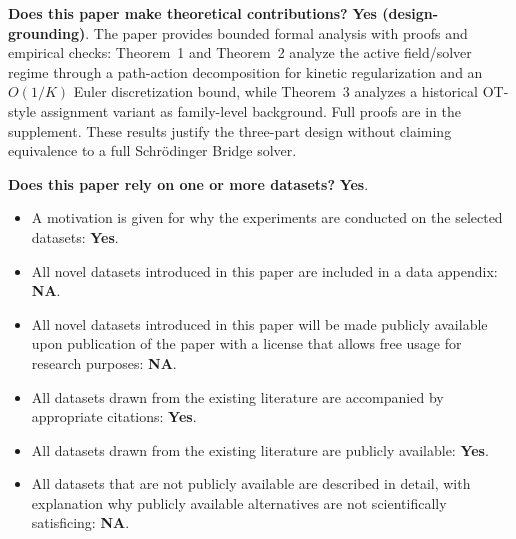 \documentclass[letterpaper]{article}
\begin{document}
\noindent\textbf{Does this paper make theoretical contributions?} \textbf{Yes (design-grounding)}. The paper provides bounded formal analysis with proofs and empirical checks: Theorem~1 and Theorem~2 analyze the active field/solver regime through a path-action decomposition for kinetic regularization and an $O(1/K)$ Euler discretization bound, while Theorem~3 analyzes a historical OT-style assignment variant as family-level background. Full proofs are in the supplement. These results justify the three-part design without claiming equivalence to a full Schr\"odinger Bridge solver.

\noindent\textbf{Does this paper rely on one or more datasets?} \textbf{Yes}.
\begin{itemize}
\item A motivation is given for why the experiments are conducted on the selected datasets: \textbf{Yes}.
\item All novel datasets introduced in this paper are included in a data appendix: \textbf{NA}.
\item All novel datasets introduced in this paper will be made publicly available upon publication of the paper with a license that allows free usage for research purposes: \textbf{NA}.
\item All datasets drawn from the existing literature are accompanied by appropriate citations: \textbf{Yes}.
\item All datasets drawn from the existing literature are publicly available: \textbf{Yes}.
\item All datasets that are not publicly available are described in detail, with explanation why publicly available alternatives are not scientifically satisficing: \textbf{NA}.
\end{itemize}
\end{document}

